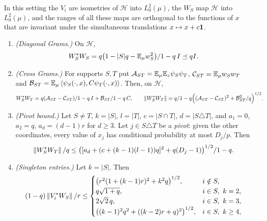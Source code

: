 \begin{lemma}\label{lem:general-star}
In this setting the $V_i$ are isometries of $\mathcal H$ into $L^2_0(\mu)$, the $W_S$
map $\mathcal H$ into $L^2_0(\mu)$, and the ranges of all these maps are orthogonal
to the functions of $x$ that are invariant under the simultaneous translations
$x\mapsto x+c\mathbf 1$.
\begin{enumerate}[label=\textup{(\alph*)}]
\item \emph{(Diagonal Grams.)} On $\mathcal H$,
  \begin{equation}\label{eq:star-diagonal}
    W_S^*W_S=q\big(1-|S|q-\mathbb E_\mu w_S^2\big)/1-q\,I\preceq qI .
  \end{equation}
\item \emph{(Cross Grams.)} For supports $S,T$ put
  $\mathcal A_{ST}=\mathbb E_\mu\mathbb E_z\psi_S\psi_T$, $\mathcal C_{ST}=\mathbb E_\mu w_Sw_T$ and
  $\mathcal B_{ST}=\mathbb E_\mu\left\langle \psi_S(\cdot,x),C\psi_T(\cdot,x)\right\rangle$. Then, on $\mathcal H$,
  \begin{equation}\label{eq:star-cross}
    W_S^*W_T=q(\mathcal A_{ST}-\mathcal C_{ST})/1-q\,I+\mathcal B_{ST}/1-q\,C,
    \qquad
    \left\|W_S^*W_T\right\|=q/1-q\Big((\mathcal A_{ST}-\mathcal C_{ST})^2
    +\mathcal B_{ST}^2/q\Big)^{1/2}.
  \end{equation}
\item \emph{(Pivot bound.)} Let $S\ne T$, $k=|S|$, $l=|T|$, $c=|S\cap T|$,
  $d=|S\triangle T|$, and $a_1=0$, $a_2=q$, $a_d=(d-1)r$ for $d\ge3$. Let
  $j\in S\triangle T$ be a \emph{pivot}: given the other coordinates, every value of
  $x_j$ has conditional probability at most $D_j/p$. Then
  \begin{equation}\label{eq:star-cross-bound}
    \left\|W_S^*W_T\right\|/q\le
    \big([a_d+(c+(k-1)(l-1))q]^2+q(D_j-1)\big)^{1/2}/1-q .
  \end{equation}
\item \emph{(Singleton entries.)} Let $k=|S|$. Then
  \begin{equation}\label{eq:singleton-star}
    (1-q)\left\|V_i^*W_S\right\|/r\le
    \begin{cases}
      \big(r^2(1+(k-1)r)^2+k^2q\big)^{1/2}, & i\notin S,\\
      q\sqrt{1+q}, & i\in S,\ k=2,\\
      2\sqrt2\,q, & i\in S,\ k=3,\\
      \big((k-1)^2q^2+((k-2)r+q)^2\big)^{1/2}, & i\in S,\ k\ge4,
    \end{cases}
  \end{equation}

\end{enumerate}
\end{lemma}
